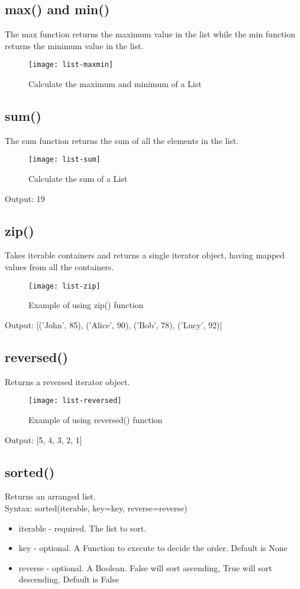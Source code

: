 \subsection{max() and min()}
The max function returns the maximum value in the list while the min function returns the minimum value in the list.
\begin{figure}[h]
	\centering
	\texttt{[image: list-maxmin]}
	\caption{Calculate the maximum and minimum of a List}
	\label{fig:list-maxmin}
\end{figure}

\subsection{sum()}
The sum function returns the sum of all the elements in the list.
\begin{figure}[h]
	\centering
	\texttt{[image: list-sum]}
	\caption{Calculate the sum of a List}
	\label{fig:list-list-sum}
\end{figure}

Output: 19

\subsection{zip()}
Takes iterable containers and returns a single iterator object, having mapped
values from all the containers.

\begin{figure}[h]
	\centering
	\texttt{[image: list-zip]}
	\caption{Example of using zip() function}
	\label{fig:list-zip}
\end{figure}
Output: [('John', 85), ('Alice', 90), ('Bob', 78), ('Lucy', 92)]

\subsection{reversed()}
Returns a reversed iterator object.
\begin{figure}[h]
	\centering
	\texttt{[image: list-reversed]}
	\caption{Example of using reversed() function}
	\label{fig:list-reversed}
\end{figure}
Output: [5, 4, 3, 2, 1]

\subsection{sorted()}
Returns an arranged list. \\
Syntax: sorted(iterable, key=key, reverse=reverse)
\begin{itemize}
	\item iterable - required. The list to sort.
	\item key - optional. A Function to execute to decide the order. Default is None
	\item reverse - optional. A Boolean. False will sort ascending, True will sort descending. Default is False
\end{itemize}

